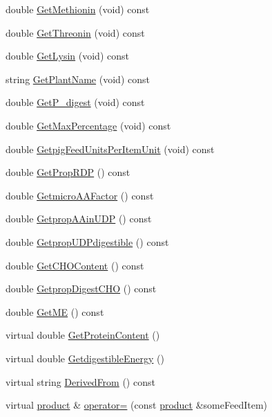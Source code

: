\begin{DoxyCompactItemize}
double \hyperlink{classfeed_item_ac0bd79ba7a1d138019d575f663d8c90e}{GetMethionin} (void) const 
\item 
double \hyperlink{classfeed_item_a6b9967db5cf1adde29ea5d92ff5659f2}{GetThreonin} (void) const 
\item 
double \hyperlink{classfeed_item_ab371de23a9de676670776b7af72a510f}{GetLysin} (void) const 
\item 
string \hyperlink{classfeed_item_a321aef5f54fda8f1efb8171b34426b97}{GetPlantName} (void) const 
\item 
double \hyperlink{classfeed_item_a7cdd42f66932edf929ceb2cc722a9388}{GetP\_\-digest} (void) const 
\item 
double \hyperlink{classfeed_item_a4d48b3435d41b59af68be30722fcab7f}{GetMaxPercentage} (void) const 
\item 
double \hyperlink{classfeed_item_ab3a6d62f0c19c58dc8437779ee7be171}{GetpigFeedUnitsPerItemUnit} (void) const 
\item 
double \hyperlink{classfeed_item_ad4a0a39f98a0ad57cc469d66eaacf576}{GetPropRDP} () const 
\item 
double \hyperlink{classfeed_item_aa8f5021c52de69702c08d5c8bb543a49}{GetmicroAAFactor} () const 
\item 
double \hyperlink{classfeed_item_a10093e6e59281eadf6ffb4e3c2a7c2b8}{GetpropAAinUDP} () const 
\item 
double \hyperlink{classfeed_item_a6721f9ea04781bf19ee97e9fbbcb32bb}{GetpropUDPdigestible} () const 
\item 
double \hyperlink{classfeed_item_ab902ec2617b4088620e2ef834738d67a}{GetCHOContent} () const 
\item 
double \hyperlink{classfeed_item_aca03317c4df43555b701e1bd11f7e287}{GetpropDigestCHO} () const 
\item 
double \hyperlink{classfeed_item_a8691a50ce52a8c3da1d022cae9b4ff13}{GetME} () const 
\item 
virtual double \hyperlink{classfeed_item_a9108f7c64a99965e0275b63c76a15f5b}{GetProteinContent} ()
\item 
virtual double \hyperlink{classfeed_item_a362c088eb02c044aabff9e987de44c11}{GetdigestibleEnergy} ()
\item 
virtual string \hyperlink{classfeed_item_a4f69deaedb7678ebab0aa8feb267ac64}{DerivedFrom} () const 
\item 
virtual \hyperlink{classproduct}{product} \& \hyperlink{classfeed_item_aff5b258f8da3b96282898cb9fa685c2f}{operator=} (const \hyperlink{classproduct}{product} \&someFeedItem)

\end{DoxyCompactItemize}
